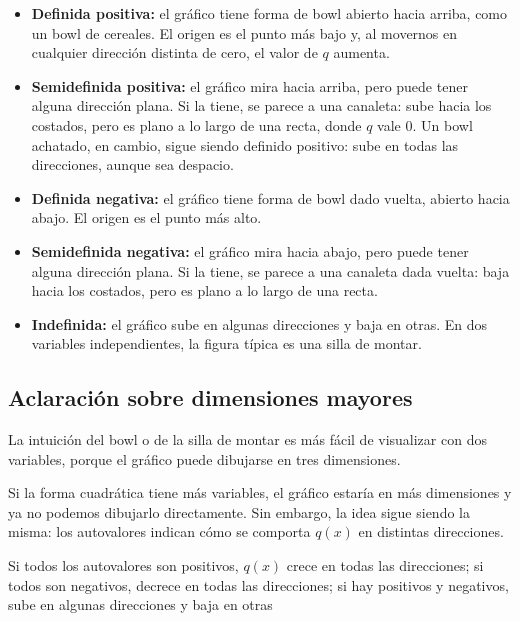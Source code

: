 \documentclass{article}
\begin{document}
\begin{itemize}
  \item \textbf{Definida positiva:} el gráfico tiene forma de bowl abierto hacia arriba, como un bowl de cereales. El origen es el punto más bajo y, al movernos en cualquier dirección distinta de cero, el valor de \(q\) aumenta.

  \item \textbf{Semidefinida positiva:} el gráfico mira hacia arriba, pero puede tener alguna dirección plana. Si la tiene, se parece a una canaleta: sube hacia los costados, pero es plano a lo largo de una recta, donde \(q\) vale \(0\). Un bowl achatado, en cambio, sigue siendo definido positivo: sube en todas las direcciones, aunque sea despacio.

  \item \textbf{Definida negativa:} el gráfico tiene forma de bowl dado vuelta, abierto hacia abajo. El origen es el punto más alto.

  \item \textbf{Semidefinida negativa:} el gráfico mira hacia abajo, pero puede tener alguna dirección plana. Si la tiene, se parece a una canaleta dada vuelta: baja hacia los costados, pero es plano a lo largo de una recta.

  \item \textbf{Indefinida:} el gráfico sube en algunas direcciones y baja en otras. En dos variables independientes, la figura típica es una silla de montar.
\end{itemize}


\subsection*{Aclaración sobre dimensiones mayores}

La intuición del bowl o de la silla de montar es más fácil de visualizar con dos variables, porque el gráfico puede dibujarse en tres dimensiones.

Si la forma cuadrática tiene más variables, el gráfico estaría en más dimensiones y ya no podemos dibujarlo directamente. Sin embargo, la idea sigue siendo la misma: los autovalores indican cómo se comporta \(q(x)\) en distintas direcciones.

{\color{teal}
Si todos los autovalores son positivos, \(q(x)\) crece en todas las direcciones; si todos son negativos, decrece en todas las direcciones; si hay positivos y negativos, sube en algunas direcciones y baja en otras}
\end{document}
